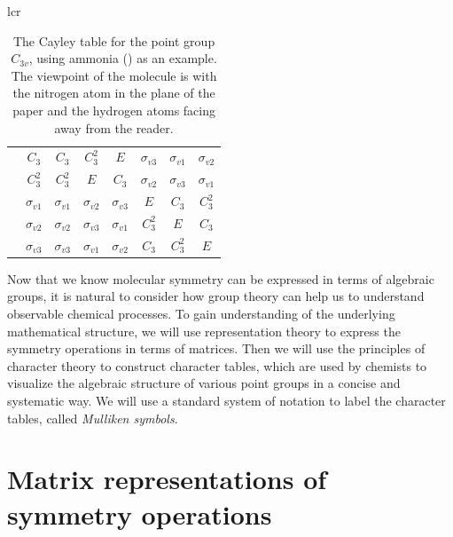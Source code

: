 \documentclass{article}
\begin{document}
\begin{table}[ht]
\begin{tabular}{lcr}
\begin{tabular}{cc|cccccc}
                & $C_3$ & $C_3$ & $C_3^2$ & $E$ & $\sigma_{v3}$ & $\sigma_{v1}$ & $\sigma_{v2}$\\
                & $C_3^2$ & $C_3^2$ & $E$ & $C_3$ & $\sigma_{v2}$ & $\sigma_{v3}$ & $\sigma_{v1}$\\
                & $\sigma_{v1}$ & $\sigma_{v1}$ & $\sigma_{v2}$ & $\sigma_{v3}$ & $E$ & $C_3$ & $C_3^2$\\
                & $\sigma_{v2}$ & $\sigma_{v2}$ & $\sigma_{v3}$ & $\sigma_{v1}$ & $C_3^2$ & $E$ & $C_3$\\
                & $\sigma_{v3}$ & $\sigma_{v3}$ & $\sigma_{v1}$ & $\sigma_{v2}$ & $C_3$ & $C_3^2$ & $E$
            \end{tabular}
        \end{tabular}
        \caption{The Cayley table for the point group $C_{3v}$, using ammonia () as an example. The viewpoint of the molecule is with the nitrogen atom in the plane of the paper and the hydrogen atoms facing away from the reader.}
        \label{tab:c3vcayley}
    \end{table}

    Now that we know molecular symmetry can be expressed in terms of algebraic groups, it is natural to consider how group theory can help us to understand observable chemical processes. To gain understanding of the underlying mathematical structure, we will use representation theory to express the symmetry operations in terms of matrices. Then we will use the principles of character theory to construct character tables, which are used by chemists to visualize the algebraic structure of various point groups in a concise and systematic way. We will use a standard system of notation to label the character tables, called \emph{Mulliken symbols}. \cite{mulliken1955}

    \section{Matrix representations of symmetry operations}

    \label{sec:matricesc2vc3v}

    \enlargethispage{\baselineskip}
\end{document}
